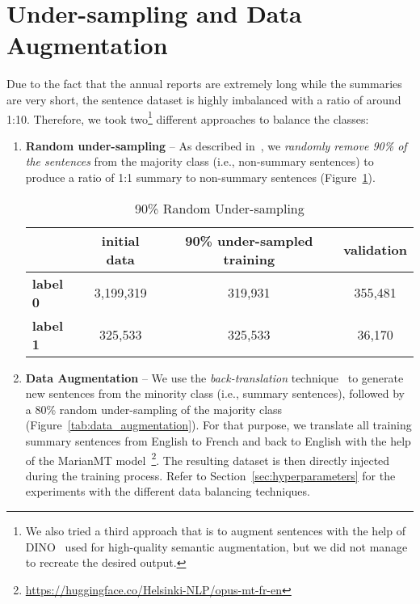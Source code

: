 \section{Under-sampling and Data Augmentation}\label{sec:data_augmentation}
Due to the fact that the annual reports are extremely long while the summaries are very short, the sentence dataset is highly imbalanced with a ratio of around 1:10.
Therefore, we took two\footnote{
    We also tried a third approach that is to augment sentences with the help of DINO~\cite{schick2021generating} used for high-quality
    semantic augmentation, but we did not manage to recreate the desired output.
} different approaches to balance the classes:
\begin{enumerate}
    \item \textbf{Random under-sampling} -- As described in~\cite{weiss2013foundations, wongvorachan2023undersampling}, we \emph{randomly remove 90\% of the sentences} from the majority class (i.e., non-summary sentences) to produce a ratio of 1:1 summary to non-summary sentences (Figure~\ref{tab:random_under_sampling}).
    \begin{table}[ht]
        \centering
        \begin{tabular}{lccc}
            \toprule
                & \textbf{initial data} & \textbf{90\% under-sampled training} & \textbf{validation} \\
            \midrule
                \textbf{label 0} & 3,199,319 & 319,931 & 355,481 \\
                \textbf{label 1} & 325,533 & 325,533 & 36,170 \\
            \bottomrule
        \end{tabular}
        \caption{90\% Random Under-sampling}\label{tab:random_under_sampling}
    \end{table}
    \item \textbf{Data Augmentation} -- We use the \emph{back-translation} technique~\cite{hoang-etal-2018-iterative} to generate new sentences from the minority class (i.e., summary sentences), followed by a 80\% random under-sampling of the majority class (Figure~\ref{tab:data_augmentation}).
    For that purpose, we translate all training summary sentences from English to French and back to English with the help of the MarianMT model~\cite{junczysdowmunt2018marian}\footnote{\url{https://huggingface.co/Helsinki-NLP/opus-mt-fr-en}}.
    The resulting dataset is then directly injected during the training process.
    Refer to Section~\ref{sec:hyperparameters} for the experiments with the different data balancing techniques.

\end{enumerate}
